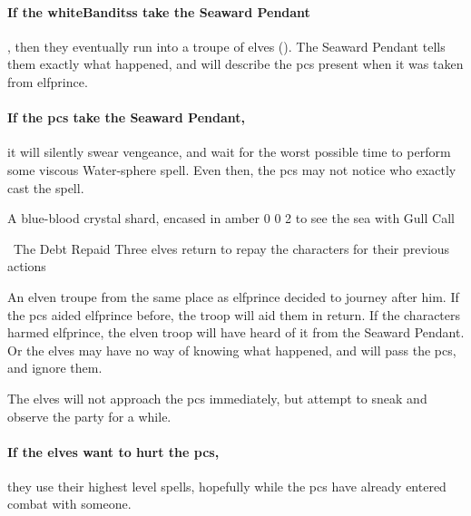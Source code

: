 \paragraph{If the \glspl{whiteBandits} take the Seaward Pendant},
then they eventually run into a troupe of elves ().
The Seaward Pendant tells them exactly what happened, and will describe the \glspl{pc} present when it was taken from \gls{elfprince}.

\paragraph{If the \glspl{pc} take the Seaward Pendant,}
it will silently swear vengeance, and wait for the worst possible time to perform some viscous Water-\gls{sphere} \gls{spell}.
Even then, the \glspl{pc} may not notice who exactly cast the spell.

  {A blue-blood crystal shard, encased in amber}%
  {0}%
  {0}%
  {2}%
  {to see the sea with }%
  {Gull Call}%
  {
    \setcounter{Water}{3}
    \setcounter{Vigilance}{2}
    \setcounter{Performance}{1}
    \setcounter{Survival}{1}
  }%

\showStdSpells

\elfprince

\showStdSpells

{\squash~The Debt Repaid}%
{Three elves return to repay the characters for their previous actions}%
\label{karmaElves}

An elven troupe from the same place as \gls{elfprince} decided to journey after him.
If the \glspl{pc} aided \gls{elfprince} before, the troop will aid them in return.
If the characters harmed \gls{elfprince}, the elven troop will have heard of it from the Seaward Pendant.
Or the elves may have no way of knowing what happened, and will pass the \glspl{pc}, and ignore them.

The elves will not approach the \glspl{pc} immediately, but attempt to sneak and observe the party for a while.

\paragraph{If the elves want to hurt the \glspl{pc},}
they use their highest level spells, hopefully while the \glspl{pc} have already entered combat with someone.

